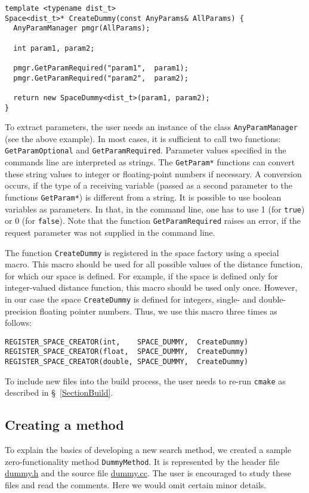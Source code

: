 \documentclass[runningheads,a4paper]{llncs}
\newcommand{\ttt}[1]{\texttt{#1}}
\begin{document}
\begin{verbatim}
template <typename dist_t>
Space<dist_t>* CreateDummy(const AnyParams& AllParams) {
  AnyParamManager pmgr(AllParams);

  int param1, param2;

  pmgr.GetParamRequired("param1",  param1);
  pmgr.GetParamRequired("param2",  param2);

  return new SpaceDummy<dist_t>(param1, param2);
}
\end{verbatim}
To extract parameters, the user needs an instance of the class \ttt{AnyParamManager} (see the above example).
In most cases, it is sufficient to call two functions: \ttt{GetParamOptional} and
\ttt{GetParamRequired}.
Parameter values specified in the commands line are interpreted as strings.
The \ttt{GetParam*} functions can convert these string values
to integer or floating-point numbers if necessary.
A conversion occurs, if the type of a receiving variable (passed as a second parameter
to the functions \ttt{GetParam*}) is different from a string.
It is possible to use boolean variables as parameters.
In that, in the command line, one has to use 1 (for \ttt{true}) or 0 (for \ttt{false}).
Note that the function \ttt{GetParamRequired} raises an error, 
if the request parameter was not supplied in the command line.

The function \ttt{CreateDummy} is registered in the space factory using a special macro.
This macro should be used for all possible values of the distance function,
for which our space is defined. For example, if the space is defined
only for integer-valued distance function, this macro should be used only once.
However, in our case the space \ttt{CreateDummy} is defined for integers,
single- and double-precision floating pointer numbers. Thus, we use this macro
three times as follows:
\begin{verbatim}
REGISTER_SPACE_CREATOR(int,    SPACE_DUMMY,  CreateDummy)
REGISTER_SPACE_CREATOR(float,  SPACE_DUMMY,  CreateDummy)
REGISTER_SPACE_CREATOR(double, SPACE_DUMMY,  CreateDummy)
\end{verbatim}
To include new files into the build process, 
the user needs to re-run \ttt{cmake} as described in \S~\ref{SectionBuild}.

\subsection{Creating a method}\label{SectionCreateMethod}
To explain the basics of developing a new search method,
we created a sample zero-functionality method \texttt{DummyMethod}.
It is represented by 
the header file 
\href{https://github.com/searchivarius/NonMetricSpaceLib/blob/master/similarity_search/include/method/dummy.h}{dummy.h}
and the source file
\href{https://github.com/searchivarius/NonMetricSpaceLib/blob/master/similarity_search/src/method/dummy.cc}{dummy.cc}.
The user is encouraged to study these files and read the comments.
Here we would omit certain minor details.
\end{document}

